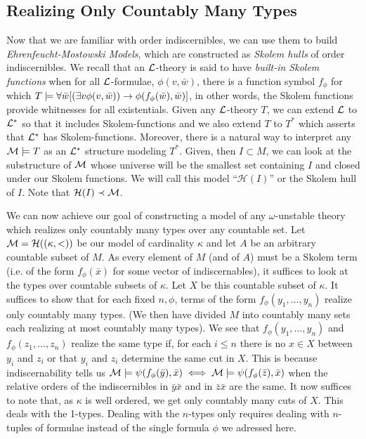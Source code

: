 \subsection{Realizing Only Countably Many Types}


Now that we are familiar with order indiscernibles, we can use them to build \textit{Ehrenfeucht-Mostowski Models}, which are constructed as \textit{Skolem hulls} of order indiscernibles. 
We recall that an \(\mathcal{L}\)-theory is said to have \textit{built-in Skolem functions} when for all \(\mathcal{L}\)-formulae, \(\phi(v, \bar{w})\), there is a function symbol \(f_\phi\) for which 
\(T \models \forall \bar{w} [(\exists v \phi(v, \bar{w})) \to \phi(f_\phi(\bar{w}), \bar{w})]\), in other words, the Skolem functions provide whitnesses for all existentials. 
Given any \(\mathcal{L}\)-theory \(T\), we can extend \(\mathcal{L}\) to \(\mathcal{L}^*\) so that it includes Skolem-functions and we also extend \(T\) to \(T^*\) which asserts that \(\mathcal{L}^*\) has Skolem-functions. 
Moreover, there is a natural way to interpret any \(\mathcal{M} \models T\) as an \(\mathcal{L}^*\) structure modeling \(T^*\).
Given, then \(I \subset M\), we can look at the substructure of \(\mathcal{M}\) whose universe will be the smallest set containing \(I\) and closed under our Skolem functions. 
We will call this model ``\(\mathcal{H}(I)\)'' or the Skolem hull of \(I\).
Note that \(\mathcal{H}(I) \prec \mathcal{M}\). %

We can now achieve our goal of constructing a model of any \(\omega\)-unstable theory which realizes only countably many types over any countable set. 
Let \(\mathcal{M} = \mathcal{H}((\kappa, <))\) be our model of cardinality \(\kappa\) and let \(A\) be an arbitrary countable subset of \(M\). %
As every element of \(M\) (and of \(A\)) must be a Skolem term (i.e. of the form \(f_\phi(\bar{x})\) for some vector of indiscernables), it suffices to look at the types over countable subsets of \(\kappa\).
Let \(X\) be this countable subset of \(\kappa\). 
It suffices to show that for each fixed \(n, \phi\), terms of the form \(f_\phi(y_1, \ldots, y_n)\) realize only countably many types. 
(We then have divided \(M\) into countably many sets each realizing at most countably many types).
We see that \(f_\phi(y_1, \ldots, y_n)\) and \(f_\phi(z_1, \ldots, z_n)\) realize the same type if, for each \(i \leq n\) there is no \(x \in X\) between \(y_i\) and \(z_i\) or that \(y_i\) and \(z_i\) determine the same cut in \(X\).  
This is because indiscernability tells us \(\mathcal{M} \models \psi(f_\phi(\bar{y}), \bar{x}) \iff \mathcal{M} \models \psi(f_\phi(\bar{z}), \bar{x})\) when the relative orders of the indiscernibles in \(\bar{y}\bar{x}\) and in \(\bar{z}\bar{x}\) are the same. 
It now suffices to note that, as \(\kappa\) is well ordered, we get only countably many cuts of \(X\). 
This deals with the 1-types. Dealing with the \(n\)-types only requires dealing with \(n\)-tuples of formulae instead of the single formula \(\phi\) we adressed here. 

